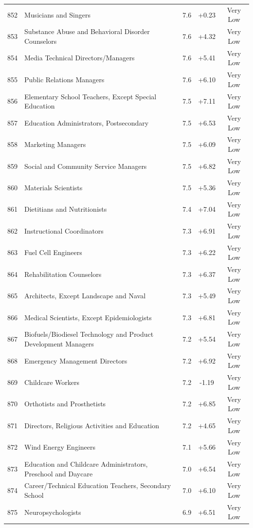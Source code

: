 {\begin{longtable}{rp{7cm}ccc}
852 & Musicians and Singers & 7.6 & +0.23 & Very Low \\
853 & Substance Abuse and Behavioral Disorder Counselors & 7.6 & +4.32 & Very Low \\
854 & Media Technical Directors/Managers & 7.6 & +5.41 & Very Low \\
855 & Public Relations Managers & 7.6 & +6.10 & Very Low \\
856 & Elementary School Teachers, Except Special Education & 7.5 & +7.11 & Very Low \\
857 & Education Administrators, Postsecondary & 7.5 & +6.53 & Very Low \\
858 & Marketing Managers & 7.5 & +6.09 & Very Low \\
859 & Social and Community Service Managers & 7.5 & +6.82 & Very Low \\
860 & Materials Scientists & 7.5 & +5.36 & Very Low \\
861 & Dietitians and Nutritionists & 7.4 & +7.04 & Very Low \\
862 & Instructional Coordinators & 7.3 & +6.91 & Very Low \\
863 & Fuel Cell Engineers & 7.3 & +6.22 & Very Low \\
864 & Rehabilitation Counselors & 7.3 & +6.37 & Very Low \\
865 & Architects, Except Landscape and Naval & 7.3 & +5.49 & Very Low \\
866 & Medical Scientists, Except Epidemiologists & 7.3 & +6.81 & Very Low \\
867 & Biofuels/Biodiesel Technology and Product Development Managers & 7.2 & +5.54 & Very Low \\
868 & Emergency Management Directors & 7.2 & +6.92 & Very Low \\
869 & Childcare Workers & 7.2 & -1.19 & Very Low \\
870 & Orthotists and Prosthetists & 7.2 & +6.85 & Very Low \\
871 & Directors, Religious Activities and Education & 7.2 & +4.65 & Very Low \\
872 & Wind Energy Engineers & 7.1 & +5.66 & Very Low \\
873 & Education and Childcare Administrators, Preschool and Daycare & 7.0 & +6.54 & Very Low \\
874 & Career/Technical Education Teachers, Secondary School & 7.0 & +6.10 & Very Low \\
875 & Neuropsychologists & 6.9 & +6.51 & Very Low \\

\end{longtable}}
